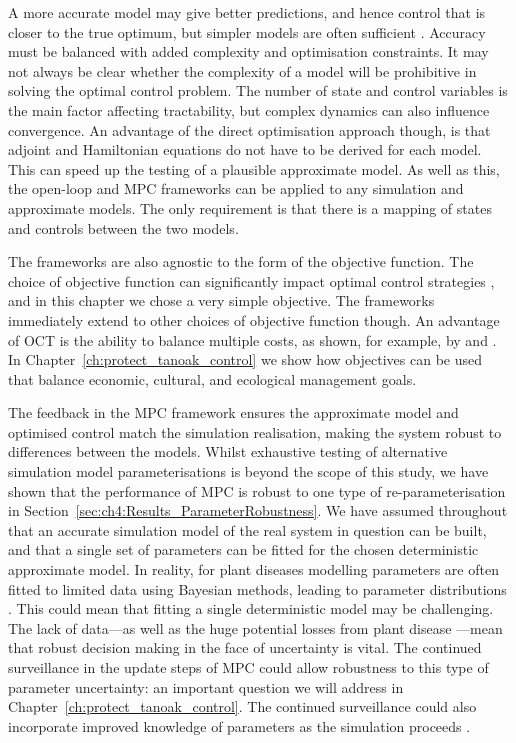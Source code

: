 A more accurate model may give better predictions, and hence control that is closer to the true optimum, but simpler models are often sufficient \citep{thompson_effect_2018}. Accuracy must be balanced with added complexity and optimisation constraints. It may not always be clear whether the complexity of a model will be prohibitive in solving the optimal control problem. The number of state and control variables is the main factor affecting tractability, but complex dynamics can also influence convergence. An advantage of the direct optimisation approach though, is that adjoint and Hamiltonian equations do not have to be derived for each model. This can speed up the testing of a plausible approximate model. As well as this, the open-loop and MPC frameworks can be applied to any simulation and approximate models. The only requirement is that there is a mapping of states and controls between the two models. 

The frameworks are also agnostic to the form of the objective function. The choice of objective function can significantly impact optimal control strategies \citep{probert_decision_2016}, and in this chapter we chose a very simple objective. The frameworks immediately extend to other choices of objective function though. An advantage of OCT is the ability to balance multiple costs, as shown, for example, by \citet{brown_role_2011} and \citet{bokil_optimal_2019}. In Chapter~\ref{ch:protect_tanoak_control} we show how objectives can be used that balance economic, cultural, and ecological management goals.

The feedback in the MPC framework ensures the approximate model and optimised control match the simulation realisation, making the system robust to differences between the models. Whilst exhaustive testing of alternative simulation model parameterisations is beyond the scope of this study, we have shown that the performance of MPC is robust to one type of re-parameterisation in Section~\ref{sec:ch4:Results_ParameterRobustness}. We have assumed throughout that an accurate simulation model of the real system in question can be built, and that a single set of parameters can be fitted for the chosen deterministic approximate model. In reality, for plant diseases modelling parameters are often fitted to limited data using Bayesian methods, leading to parameter distributions \citep[e.g.][]{kleczkowski_parameter_2007, parry_bayesian_2014}. This could mean that fitting a single deterministic model may be challenging. The lack of data---as well as the huge potential losses from plant disease \citep{savary_global_2019}---mean that robust decision making in the face of uncertainty is vital. The continued surveillance in the update steps of MPC could allow robustness to this type of parameter uncertainty: an important question we will address in Chapter~\ref{ch:protect_tanoak_control}. The continued surveillance could also incorporate improved knowledge of parameters as the simulation proceeds \citep{thompson_control_2018}.

